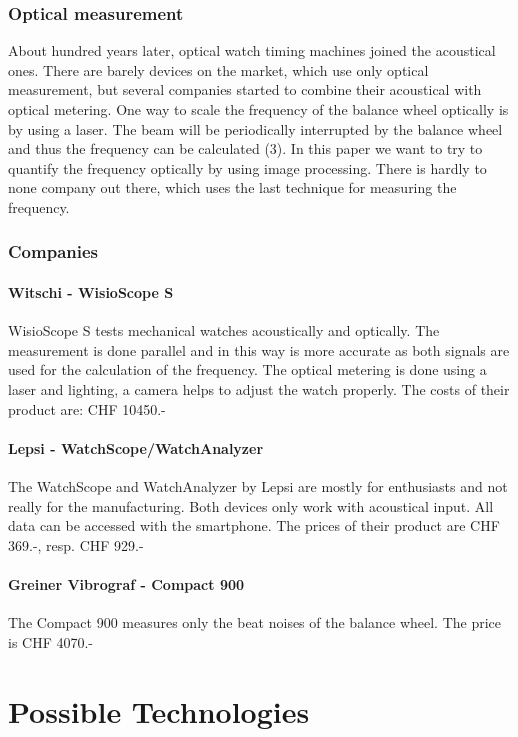 \documentclass[11pt]{report}
\begin{document}
\subsection{Optical measurement}
About hundred years later, optical watch timing machines joined the acoustical ones. There are barely devices on the market, which use only optical measurement, but several companies started to combine their acoustical with optical metering. One way to scale the frequency of the balance wheel optically is by using a laser. The beam will be periodically interrupted by the balance wheel and thus the frequency can be calculated (3). In this paper we want to try to quantify the frequency optically by using image processing. There is hardly to none company out there, which uses the last technique for measuring the frequency.

\subsection{Companies}
\subsubsection{Witschi - WisioScope S}
WisioScope S tests mechanical watches acoustically and optically. The measurement is done parallel and in this way is more accurate as both signals are used for the calculation of the frequency.
The optical metering is done using a laser and lighting, a camera helps to adjust the watch properly. The costs of their product are: CHF 10450.-

\subsubsection{Lepsi - WatchScope/WatchAnalyzer}
The WatchScope and WatchAnalyzer by Lepsi are mostly for enthusiasts and not really for the manufacturing. Both devices only work with acoustical input. All data can be accessed with the smartphone. The prices of their product are CHF 369.-, resp. CHF 929.-

\subsubsection{Greiner Vibrograf - Compact 900}
The Compact 900 measures only the beat noises of the balance wheel. The price is CHF 4070.-

\chapter {Possible Technologies}
\end{document}

